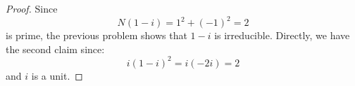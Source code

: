\begin{proof}
    Since
    \[ N(1-i) = 1^2+(-1)^2 = 2 \]
    is prime, the previous problem shows that $1-i$ is irreducible. Directly, we have the second claim since:
    \[ i(1-i)^2 = i(-2i) = 2 \]
    and $i$ is a unit.
\end{proof}